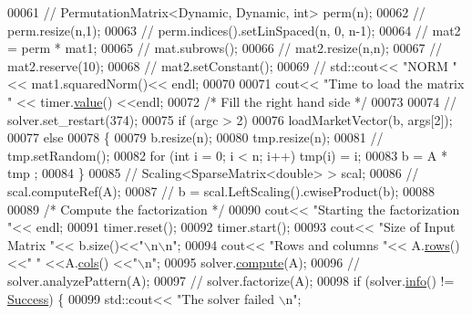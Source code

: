 \begin{DoxyCode}
00061 \textcolor{comment}{//   PermutationMatrix<Dynamic, Dynamic, int> perm(n);}
00062 \textcolor{comment}{//   perm.resize(n,1);}
00063 \textcolor{comment}{//   perm.indices().setLinSpaced(n, 0, n-1);}
00064 \textcolor{comment}{//   mat2 = perm * mat1;}
00065 \textcolor{comment}{//   mat.subrows();}
00066 \textcolor{comment}{//   mat2.resize(n,n); }
00067 \textcolor{comment}{//   mat2.reserve(10);}
00068 \textcolor{comment}{//   mat2.setConstant();}
00069 \textcolor{comment}{//   std::cout<< "NORM " << mat1.squaredNorm()<< endl;  }
00070 
00071   cout<< \textcolor{stringliteral}{"Time to load the matrix "} << timer.\hyperlink{class_eigen_1_1_bench_timer_a26760f963ed8b64c126159bfea57735e}{value}() <<endl;
00072   \textcolor{comment}{/* Fill the right hand side */}
00073 
00074 \textcolor{comment}{//   solver.set\_restart(374);}
00075   \textcolor{keywordflow}{if} (argc > 2)
00076     loadMarketVector(b, args[2]);
00077   \textcolor{keywordflow}{else} 
00078   \{
00079     b.resize(n);
00080     tmp.resize(n);
00081 \textcolor{comment}{//       tmp.setRandom();}
00082     \textcolor{keywordflow}{for} (\textcolor{keywordtype}{int} i = 0; i < n; i++) tmp(i) = i; 
00083     b = A * tmp ;
00084   \}
00085 \textcolor{comment}{//   Scaling<SparseMatrix<double> > scal; }
00086 \textcolor{comment}{//   scal.computeRef(A);}
00087 \textcolor{comment}{//   b = scal.LeftScaling().cwiseProduct(b);}
00088 
00089   \textcolor{comment}{/* Compute the factorization */}
00090   cout<< \textcolor{stringliteral}{"Starting the factorization "}<< endl; 
00091   timer.reset();
00092   timer.start(); 
00093   cout<< \textcolor{stringliteral}{"Size of Input Matrix "}<< b.size()<<\textcolor{stringliteral}{"\(\backslash\)n\(\backslash\)n"};
00094   cout<< \textcolor{stringliteral}{"Rows and columns "}<< A.\hyperlink{group___sparse_core___module_a62e61bb861eee306d5b069ce652b5aa5}{rows}() <<\textcolor{stringliteral}{" "} <<A.\hyperlink{group___sparse_core___module_aa391750e3c530227e4a5c3c52e959975}{cols}() <<\textcolor{stringliteral}{"\(\backslash\)n"};
00095   solver.\hyperlink{group___iterative_linear_solvers___module_a7dfa55c55e82d697bde227696a630914}{compute}(A);
00096 \textcolor{comment}{//   solver.analyzePattern(A);}
00097 \textcolor{comment}{//   solver.factorize(A);}
00098   \textcolor{keywordflow}{if} (solver.\hyperlink{group___iterative_linear_solvers___module_a0d6b459433a316b4f12d48e5c80d61fe}{info}() != \hyperlink{group__enums_gga85fad7b87587764e5cf6b513a9e0ee5ea52581b035f4b59c203b8ff999ef5fcea}{Success}) \{
00099     std::cout<< \textcolor{stringliteral}{"The solver failed \(\backslash\)n"};

\end{DoxyCode}
